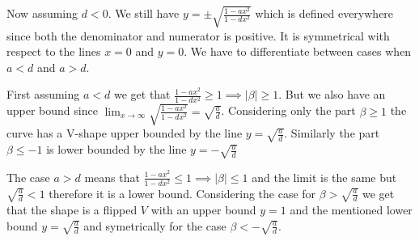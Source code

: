 \documentclass[12pt, a4paper]{article}
\begin{document}
Now assuming $d < 0$. We still have $y = \pm \sqrt{\frac{1-ax^2}{1-dx^2}}$ which is defined everywhere since both the denominator and numerator is positive. It is symmetrical with respect to the lines $x=0$ and $y=0$. We have to differentiate between cases when $a < d$ and $a > d$.

First assuming $a < d$ we get that $\frac{1-ax^2}{1-dx^2} \geq 1 \implies |\beta| \geq 1$. But we also have an upper bound since $\lim_{x \to \infty} \sqrt{\frac{1-ax^2}{1-dx^2}} = \sqrt{\frac{a}{d}}$. Considering only the part $\beta \geq 1$ the curve has a V-shape upper bounded by the line $y=\sqrt{\frac{a}{d}}$. Similarly the part $\beta \leq -1$ is lower bounded by the line $y=-\sqrt{\frac{a}{d}}$

The case $a > d$ means that $\frac{1-ax^2}{1-dx^2} \leq 1 \implies |\beta| \leq 1$ and the limit is the same but $\sqrt{\frac{a}{d}} < 1$ therefore it is a lower bound. Considering the case for $\beta > \sqrt{\frac{a}{d}}$ we get that the shape is a flipped $V$ with an upper bound $y=1$ and the mentioned lower bound $y=\sqrt{\frac{a}{d}}$ and symetrically for the case $\beta < -\sqrt{\frac{a}{d}}$.
\end{document}
